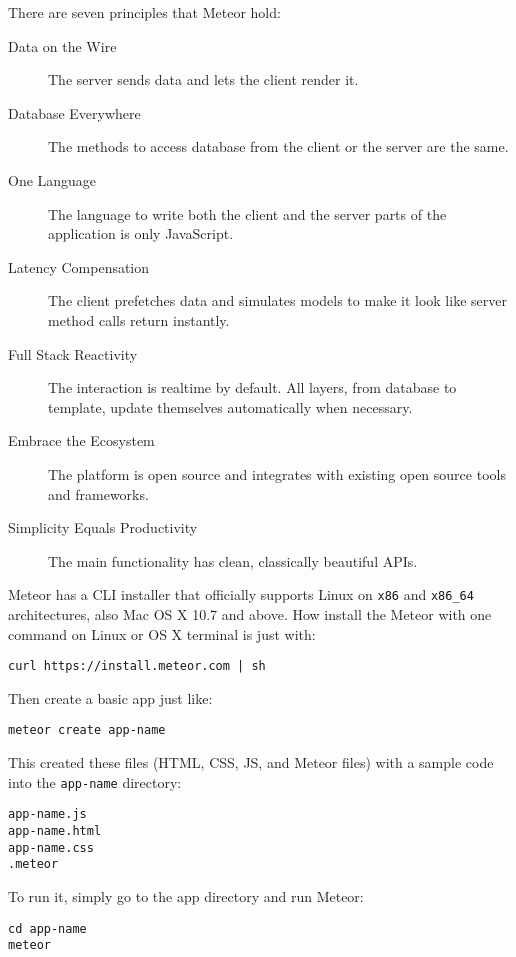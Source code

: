\clearpage

\noindent There are seven principles that Meteor hold:

\begin{description}
\item [Data on the Wire] The server sends data and lets the client render it.
\item [Database Everywhere] The methods to access database from the client or the server are the same.
\item [One Language] The language to write both the client and the server parts of the application is only JavaScript.
\item [Latency Compensation] The client prefetches data and simulates models to make it look like server method calls return instantly.
\item [Full Stack Reactivity] The interaction is realtime by default. All layers, from database to template, update themselves automatically when necessary.
\item [Embrace the Ecosystem] The platform is open source and integrates with existing open source tools and frameworks.
\item [Simplicity Equals Productivity]  The main functionality has clean, classically beautiful APIs.
\end{description}

Meteor has a \ac{CLI} installer that officially supports Linux on \verb|x86| and \verb|x86_64| architectures, also Mac OS X 10.7 and above.
How install the Meteor with one command on Linux or OS X terminal is just with:

\begin{verbatim}
curl https://install.meteor.com | sh
\end{verbatim}

Then create a basic app just like:

\begin{verbatim}
meteor create app-name
\end{verbatim}

This created these files (\ac{HTML}, \ac{CSS}, \ac{JS}, and Meteor files) with a sample code into the \verb|app-name| directory:

\begin{verbatim}
app-name.js
app-name.html
app-name.css
.meteor
\end{verbatim}

To run it, simply go to the app directory and run Meteor:

\begin{verbatim}
cd app-name
meteor
\end{verbatim}

